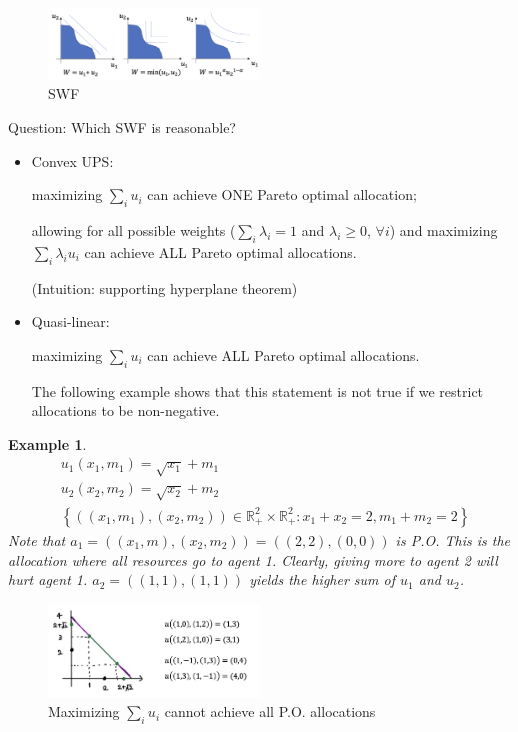 \documentclass[11pt,leqno]{article}
\newtheorem{example}{Example}
\begin{document}
 \begin{figure}[h]
    \centering
    \includegraphics[width=0.5\textwidth]{figure 4.png}
    \caption{SWF}
    \label{fig:1}
\end{figure}

Question: Which SWF is reasonable?

\begin{itemize}
    \item Convex UPS:  
    
    maximizing $\sum_{i}u_{i}$ can achieve ONE Pareto optimal allocation; 
    
    allowing for all possible weights ($\sum_{i}\lambda_{i}=1$ and $\lambda_{i}\geq 0$, $\forall i$) and maximizing $\sum_{i}\lambda_{i}u_{i}$ can achieve ALL Pareto optimal allocations. 

    (Intuition: supporting hyperplane theorem)
    \item Quasi-linear:  

    maximizing $\sum_{i}u_{i}$ can achieve ALL Pareto optimal allocations.  

    The following example shows that this statement is not true if we restrict allocations to be non-negative.
\end{itemize}

\begin{example}

$$
\begin{aligned}
& u_1\left(x_1, m_1\right)=\sqrt{x_1}+m_1 \\
& u_2\left(x_2, m_2\right)=\sqrt{x_2}+m_2 \\
& \left\{\left(\left(x_1, m_1\right),\left(x_2, m_2\right)\right) \in \mathbb{R}_{+}^2 \times \mathbb{R}_{+}^2: x_1+x_2=2, m_1+m_2=2\right\}
\end{aligned}
$$
Note that $a_1=\left(\left(x_1, m\right),\left(x_2, m_2\right)\right)=((2,2),(0,0))$ is P.O. 
This is the allocation where all resources go to agent 1. Clearly, giving more to agent 2 will hurt agent 1.
$a_2=((1,1),(1,1))$ yields the higher sum of $u_1$ and $u_2$.
\end{example}

 \begin{figure}[h]
    \centering
    \includegraphics[width=0.5\textwidth]{figure 5.png}
    \caption{Maximizing $\sum_{i}u_{i}$ cannot achieve all P.O. allocations}
    \label{fig:2}
\end{figure}
\end{document}
